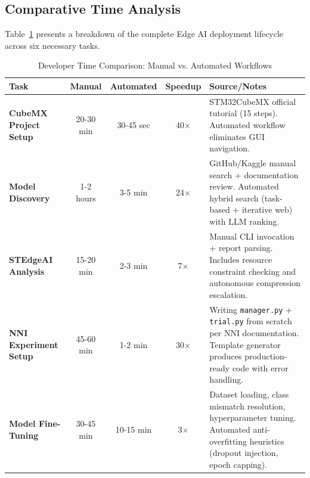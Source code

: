 \subsection{Comparative Time Analysis}

Table~\ref{tab:productivity} presents a breakdown of the complete Edge AI deployment lifecycle across six necessary tasks.

\begin{table}[htbp]
    \centering
    \caption{Developer Time Comparison: Manual vs. Automated Workflows}
    \label{tab:productivity}
    \small
    \begin{tabular}{|l|c|c|c|p{4cm}|}
        \hline
        \textbf{Task}                 & \textbf{Manual}        & \textbf{Automated} & \textbf{Speedup}   & \textbf{Source/Notes}                                                                                                                                                              \\
        \hline
        \hline
        \textbf{CubeMX Project Setup} & 20-30 min              & 30-45 sec          & 40×                & STM32CubeMX official tutorial (15 steps)\cite{st_cubemx_manual}. Automated workflow eliminates GUI navigation.                                                                     \\
        \hline
        \textbf{Model Discovery}      & 1-2 hours              & 3-5 min            & 24×                & GitHub/Kaggle manual search + documentation review. Automated hybrid search (task-based + iterative web) with LLM ranking.                                                         \\
        \hline
        \textbf{STEdgeAI Analysis}    & 15-20 min              & 2-3 min            & 7×                 & Manual CLI invocation + report parsing. Includes resource constraint checking and autonomous compression escalation.                                                               \\
        \hline
        \textbf{NNI Experiment Setup} & 45-60 min              & 1-2 min            & 30×                & Writing \texttt{manager.py} + \texttt{trial.py} from scratch per NNI documentation\cite{nni_documentation}. Template generator produces production-ready code with error handling. \\
        \hline
        \textbf{Model Fine-Tuning}    & 30-45 min              & 10-15 min          & 3×                 & Dataset loading, class mismatch resolution, hyperparameter tuning. Automated anti-overfitting heuristics (dropout injection, epoch capping).                                       \\

\end{tabular}
\end{table}
